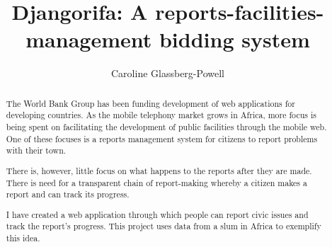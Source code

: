 \documentclass{report}
\title{Djangorifa: A reports-facilities-management bidding system}
\author{Caroline Glassberg-Powell}
\begin{document}
\maketitle

\begin{abstract}
The World Bank Group has been funding development of web applications for developing countries. As the mobile telephony market grows in Africa, more focus is being spent on facilitating the development of public facilities through the mobile web. One of these focuses is a reports management system for citizens to report problems with their town.

There is, however, little focus on what happens to the reports after they are made. There is need for a transparent chain of report-making whereby a citizen makes a report and can track its progress.

I have created a web application through which people can report civic issues and track the report's progress. This project uses data from a slum in Africa to exemplify this idea.
\end{abstract}

\tableofcontents









\printglossaries
\printbibliography
\end{document}
